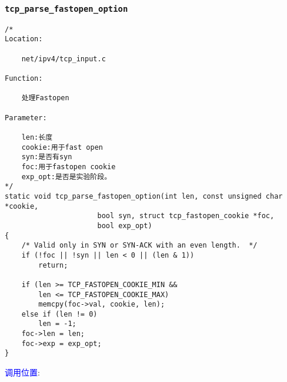         \subsubsection{\texttt{tcp_parse_fastopen_option}}
            \label{TCPOptions:tcp_parse_fastopen_option}
\begin{verbatim}
/*
Location:

    net/ipv4/tcp_input.c

Function:

    处理Fastopen

Parameter:

    len:长度
    cookie:用于fast open
    syn:是否有syn
    foc:用于fastopen cookie
    exp_opt:是否是实验阶段。
*/
static void tcp_parse_fastopen_option(int len, const unsigned char *cookie,
                      bool syn, struct tcp_fastopen_cookie *foc,
                      bool exp_opt)
{
    /* Valid only in SYN or SYN-ACK with an even length.  */
    if (!foc || !syn || len < 0 || (len & 1))
        return;

    if (len >= TCP_FASTOPEN_COOKIE_MIN &&
        len <= TCP_FASTOPEN_COOKIE_MAX)
        memcpy(foc->val, cookie, len);
    else if (len != 0)
        len = -1;
    foc->len = len;
    foc->exp = exp_opt;
}
\end{verbatim}
        \textcolor{blue}{调用位置}:

